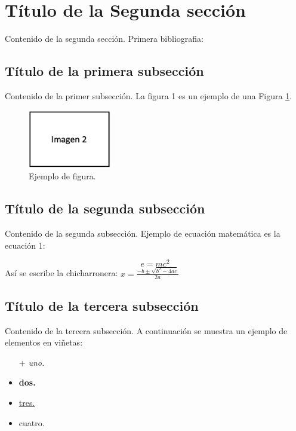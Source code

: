 \section{Título de la Segunda sección}
Contenido de la segunda sección. Primera bibliografia:\cite{bib2}

 \subsection{Título de la primera subsección}
Contenido de la primer subsección. La figura 1 es un ejemplo de una Figura \ref{imagen2}.

\begin{figure}[h] %
    \begin{center}
        \includegraphics[scale=0.68]{secciones/imagenes/imagen2}
    \end{center}
    \caption{Ejemplo de figura. \label{imagen2}}
\end{figure}

\subsection{Título de la segunda subsección}
Contenido de la segunda subsección. Ejemplo de ecuación matemática es la ecuación 1:

\begin{equation}
    e=mc^2
    \label{ecuacion}
\end{equation}
Así se escribe la chicharronera: $x = \frac {-b \pm \sqrt {b^2 - 4ac}}{2a}$ 

\subsection{Título de la tercera subsección}
Contenido de la tercera subsección. A continuación se muestra un ejemplo de elementos en viñetas:

\begin{itemize} %
    \item [+]\textit{uno.}
    \item \textbf{dos.}
    \item \underline{tres.}
    \item cuatro.
\end{itemize}



